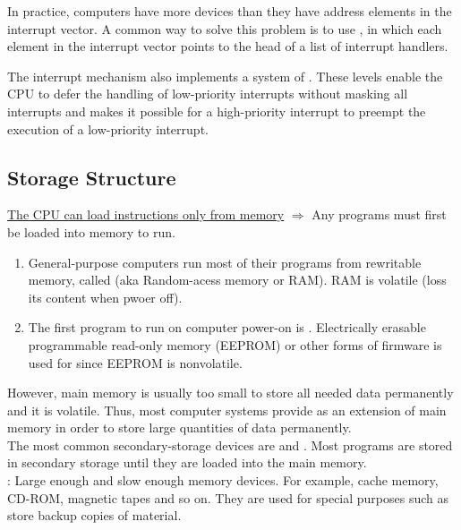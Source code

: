 In practice, computers have more devices than they have address elements in the interrupt vector. A common way to solve this problem is to use , in which each element in the interrupt vector points to the head of a list of interrupt handlers.


The interrupt mechanism also implements a system of . These levels enable the CPU to defer the handling of low-priority interrupts without masking all interrupts and makes it possible for a high-priority
interrupt to preempt the execution of a low-priority interrupt.

\subsection{Storage Structure}

\hf \underline{The CPU can load instructions only from memory} $\Rightarrow$ Any programs must first be loaded into memory to run. 

\begin{enumerate}
	\item General-purpose computers run most of their programs from rewritable memory, called (aka Random-acess memory or RAM). RAM is volatile (loss its content when pwoer off).
	\item The first program to run on computer power-on is . Electrically erasable programmable read-only memory (EEPROM) or other forms of firmware is used for  since EEPROM is nonvolatile.
\end{enumerate}

However, main memory is usually too small to store all needed data permanently and  it is volatile. Thus, most computer systems provide  as an extension of main memory in order to store large quantities of data permanently.\\

The most common secondary-storage devices are  and . Most programs are stored in secondary storage until they are loaded into the main memory.\\

: Large enough and slow enough memory devices. For example, cache memory, CD-ROM, magnetic tapes and so on. They are used for special purposes such as store backup copies of material.
